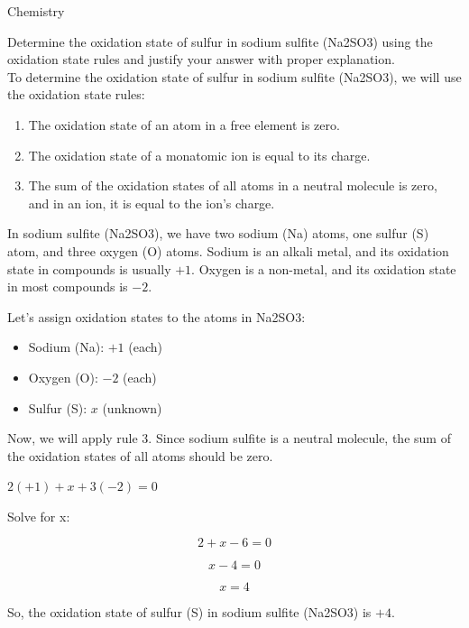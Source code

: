 \begin{AIBoxBreak}{Chemistry}

	\usermsg
	Determine the oxidation state of sulfur in sodium sulfite (Na2SO3) using the oxidation state rules and justify your answer with proper explanation.\\

	\assistantmsg
	To determine the oxidation state of sulfur in sodium sulfite (Na2SO3), we will use the oxidation state rules:

	\begin{enumerate}
		\item The oxidation state of an atom in a free element is zero.
		\item The oxidation state of a monatomic ion is equal to its charge.
		\item The sum of the oxidation states of all atoms in a neutral molecule is zero, and in an ion, it is equal to the ion's charge.
	\end{enumerate}

	In sodium sulfite (Na2SO3), we have two sodium (Na) atoms, one sulfur (S) atom, and three oxygen (O) atoms. Sodium is an alkali metal, and its oxidation state in compounds is usually $+1$. Oxygen is a non-metal, and its oxidation state in most compounds is $-2$.

	Let's assign oxidation states to the atoms in Na2SO3:

	\begin{itemize}
		\item Sodium (Na): $+1$ (each)
		\item Oxygen (O): $-2$ (each)
		\item Sulfur (S): $x$ (unknown)
	\end{itemize}

	Now, we will apply rule 3. Since sodium sulfite is a neutral molecule, the sum of the oxidation states of all atoms should be zero.

	$2(+1) + x + 3(-2) = 0$

	Solve for x:

	$$2 + x - 6 = 0$$

	$$x - 4 = 0$$

	$$x = 4$$

	So, the oxidation state of sulfur (S) in sodium sulfite (Na2SO3) is $+4$.
\end{AIBoxBreak}


